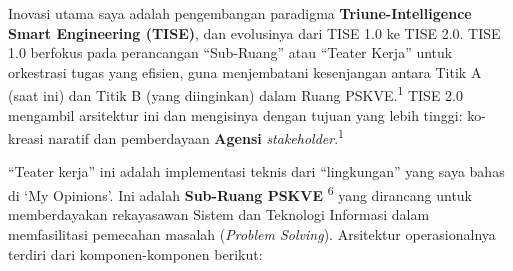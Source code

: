 \documentclass[
  letterpaper,
  DIV=11,
  numbers=noendperiod]{scrreprt}
\begin{document}
Inovasi utama saya adalah pengembangan paradigma
\textbf{Triune-Intelligence Smart Engineering (TISE)}, dan evolusinya
dari TISE 1.0 ke TISE 2.0. TISE 1.0 berfokus pada perancangan
``Sub-Ruang'' atau ``Teater Kerja'' untuk orkestrasi tugas yang efisien,
guna menjembatani kesenjangan antara Titik A (saat ini) dan Titik B
(yang diinginkan) dalam Ruang PSKVE.\textsuperscript{1} TISE 2.0
mengambil arsitektur ini dan mengisinya dengan tujuan yang lebih tinggi:
ko-kreasi naratif dan pemberdayaan \textbf{Agensi}
\emph{stakeholder}.\textsuperscript{1}

``Teater kerja'' ini adalah implementasi teknis dari ``lingkungan'' yang
saya bahas di `My Opinions'. Ini adalah \textbf{Sub-Ruang PSKVE}
\textsuperscript{6} yang dirancang untuk memberdayakan rekayasawan
Sistem dan Teknologi Informasi dalam memfasilitasi pemecahan masalah
(\emph{Problem Solving}). Arsitektur operasionalnya terdiri dari
komponen-komponen berikut:
\end{document}
